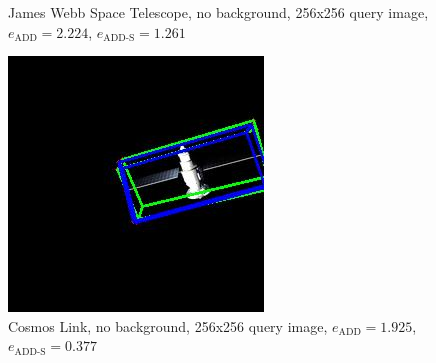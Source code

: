 \begin{figure}[h]
\begin{minipage}{0.45\linewidth}
        \caption{James Webb Space Telescope, no background, 256x256 query image, $e_\mathrm{ADD}=2.224$, $e_{\mathrm{ADD}\text{-}\mathrm{S}}=1.261$ }
        \label{fig:image2}
    \end{minipage}
\end{figure}

\begin{figure}[h]
    \centering
    \begin{minipage}{0.45\linewidth}
        \centering
        \includegraphics[width=\linewidth]{data/fig9.jpg} %
        \caption{Cosmos Link, no background, 256x256 query image, $e_\mathrm{ADD}=1.925$, $e_{\mathrm{ADD}\text{-}\mathrm{S}}=0.377$ }
        \label{fig:image1}
    \end{minipage}\hfill
    \begin{minipage}{0.45\linewidth}
        \centering

\end{minipage}
\end{figure}
